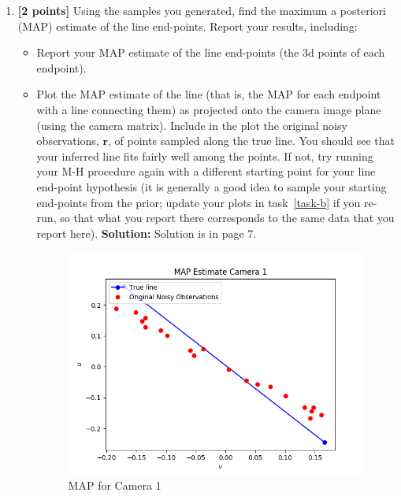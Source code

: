 \documentclass[10pt]{article}
\begin{document}
\begin{enumerate}
\item {\bf [2 points]} \label{task-c} Using the samples you generated, find the maximum a posteriori (MAP) estimate of the line end-points.
Report your results, including: 
\begin{itemize}
\item Report your MAP estimate of the line end-points (the 3d points of each endpoint).


\item Plot the MAP estimate of the line (that is, the MAP for each endpoint with a line connecting them) as projected onto the camera image plane (using the camera matrix).  Include in the plot the original noisy observations, $\mathbf{r}$, of points sampled along the true line.  You should see that your inferred line fits fairly well among the points.  If not, try running your M-H procedure again with a different starting point for your line end-point hypothesis (it is generally a good idea to sample your starting end-points from the prior; update your plots in task~\ref{task-b} if you re-run, so that what you report there corresponds to the same data that you report here).
\textbf{Solution:}
Solution is in page 7.

\begin{figure}
    \centering
    \includegraphics{figures/map_cam1.png}
    \caption{MAP for Camera 1}
    \label{fig:my_label}
\end{figure}


\end{itemize}


\end{enumerate}
\end{document}

